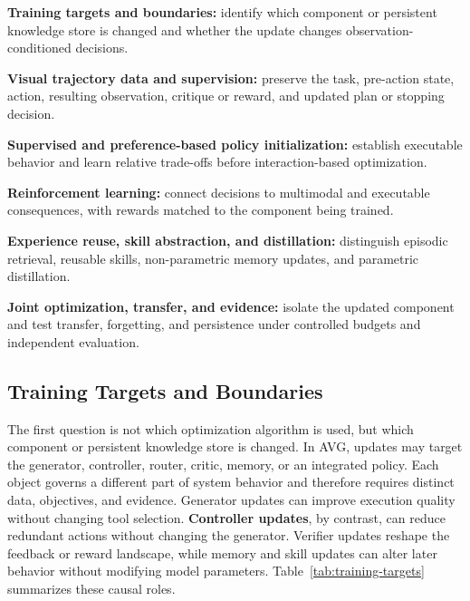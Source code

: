 \begin{keytakeaway}
\begin{keypoints}
  \item \textbf{Training targets and boundaries:} identify which component or persistent knowledge store is changed and whether the update changes observation-conditioned decisions.

  \item \textbf{Visual trajectory data and supervision:} preserve the task, pre-action state, action, resulting observation, critique or reward, and updated plan or stopping decision.

  \item \textbf{Supervised and preference-based policy initialization:} establish executable behavior and learn relative trade-offs before interaction-based optimization.

  \item \textbf{Reinforcement learning:} connect decisions to multimodal and executable consequences, with rewards matched to the component being trained.

  \item \textbf{Experience reuse, skill abstraction, and distillation:} distinguish episodic retrieval, reusable skills, non-parametric memory updates, and parametric distillation.

  \item \textbf{Joint optimization, transfer, and evidence:} isolate the updated component and test transfer, forgetting, and persistence under controlled budgets and independent evaluation.
\end{keypoints}
\end{keytakeaway}

\subsection{Training Targets and Boundaries}
\label{subsec:training-targets}

The first question is not which optimization algorithm is used, but which component or persistent knowledge store is changed. In AVG, updates may target the generator, controller, router, critic, memory, or an integrated policy. Each object governs a different part of system behavior and therefore requires distinct data, objectives, and evidence. Generator updates can improve execution quality without changing tool selection. \textbf{Controller updates}, by contrast, can reduce redundant actions without changing the generator. Verifier updates reshape the feedback or reward landscape, while memory and skill updates can alter later behavior without modifying model parameters. Table~\ref{tab:training-targets} summarizes these causal roles.

